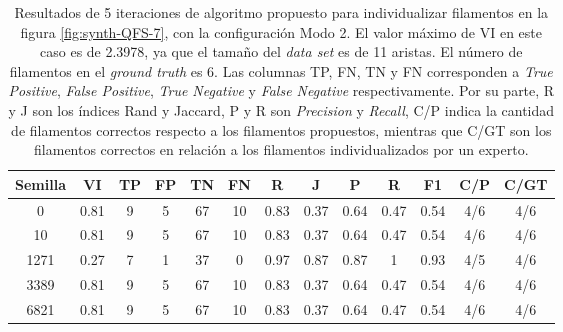 \begin{table}[h]
    \centering
    \begin{tabular}{|c|c|c|c|c|c|c|c|c|c|c|c|c|}
    \hline
        Semilla & VI & TP & FP &TN &FN & R	& J & P & R &F1 & C/P & C/GT \\ \hline 
        0    & 0.81 & 9 & 5 & 67 & 10 & 0.83 & 0.37 & 0.64 & 0.47 & 0.54 & 4/6 & 4/6\\
        10 & 0.81 & 9 & 5 & 67 & 10 & 0.83 & 0.37 & 0.64 & 0.47 & 0.54 & 4/6 & 4/6\\
        1271 & 0.27 & 7 & 1 & 37  & 0  & 0.97 & 0.87 & 0.87 & 1 & 0.93 & 4/5 & 4/6\\
        3389 & 0.81 & 9 & 5 & 67 & 10 & 0.83 & 0.37 & 0.64 & 0.47 & 0.54 & 4/6 & 4/6\\
        6821 & 0.81 & 9 & 5 & 67 & 10 & 0.83 & 0.37 & 0.64 & 0.47 & 0.54 & 4/6 & 4/6\\
        \hline
    \end{tabular}
    \caption[Resultados de 5 iteraciones de algoritmo propuesto para individualizar filamentos en la figura \ref{fig:synth-QFS-7}, con la configuraci\'on Modo 2.]{Resultados de 5 iteraciones de algoritmo propuesto para individualizar filamentos en la figura \ref{fig:synth-QFS-7}, con la configuraci\'on Modo 2. El valor m\'aximo de VI en este caso es de 2.3978, ya que el tama\~no del {\it data set} es de 11 aristas. El n\'umero de filamentos en el {\it ground truth} es 6. Las columnas TP, FN, TN y FN corresponden a {\it True Positive}, {\it  False Positive}, {\it True Negative} y {\it False Negative} respectivamente. Por su parte, R y J son los \'indices Rand y Jaccard, P y R son {\it Precision} y {\it Recall}, C/P indica la cantidad de filamentos correctos respecto a los filamentos propuestos, mientras que C/GT son los filamentos correctos en relaci\'on a los filamentos individualizados por un experto.}
    \label{tab:Synth-QuantitativeIFS-Fig7DetailedResults1}
\end{table}


